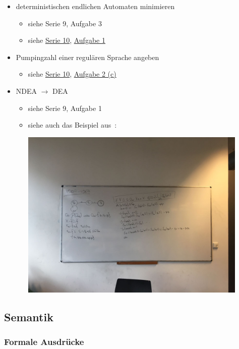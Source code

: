 \documentclass[
  a4paper,
  11pt,
]{scrartcl}
\begin{document}
\begin{itemize}
\begin{itemize}
    \end{itemize}
  \item deterministischen endlichen Automaten minimieren
    \begin{itemize}
      \item siehe Serie 9, Aufgabe 3
      \item siehe \hyperref[sub:serie_10]{Serie 10},
        \hyperref[kfs_serie_10_aufgabe_1]{Aufgabe 1}
    \end{itemize}
  \item Pumpingzahl einer regulären Sprache angeben
    \begin{itemize}
      \item siehe \hyperref[sub:serie_10]{Serie 10},
        \hyperref[kfs_serie_10_aufgabe_2_c]{Aufgabe 2 (c)}
    \end{itemize}
  \item NDEA $\rightarrow$ DEA
    \begin{itemize}
      \item siehe Serie 9, Aufgabe 1
      \item siehe auch das Beispiel aus~\cite{hopcroft2011}:

        \includegraphics[width=0.9\textwidth]{bilder/ndea_zu_dea_bsp_aus_hopcroft.jpg}
    \end{itemize}
\end{itemize}

\subsection{Semantik}
\label{sub:themen_inhalte_semantik}

\subsubsection{Formale Ausdrücke}
\label{ssub:formale_ausdruecke}
\end{document}
